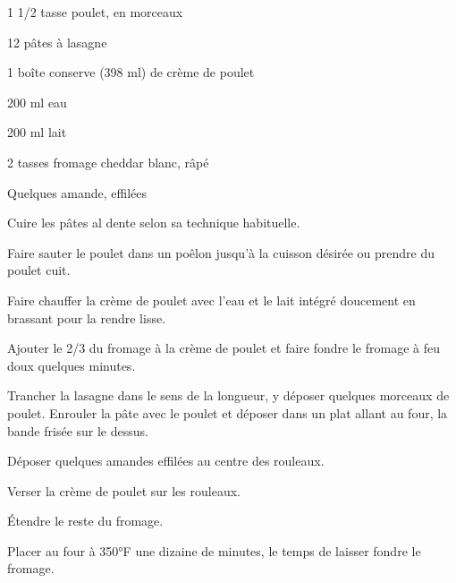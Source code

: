 


\totaltime{}


\begin{ingredients}
    \item 1 1/2 tasse poulet, en morceaux
    \item 12 pâtes à lasagne
    \item 1 boîte conserve (398 ml) de crème de poulet
    \item 200 ml eau
    \item 200 ml lait
    \item 2 tasses fromage cheddar blanc, râpé
    \item Quelques amande, effilées
\end{ingredients}

\begin{steps}
    \item Cuire les pâtes al dente selon sa technique habituelle.
    \item Faire sauter le poulet dans un poêlon jusqu'à la cuisson désirée ou prendre du poulet cuit.
    \item Faire chauffer la crème de poulet avec l'eau et le lait intégré doucement en brassant pour la rendre lisse.
    \item Ajouter le 2/3 du fromage à la crème de poulet et faire fondre le fromage à feu doux quelques minutes.
    \item Trancher la lasagne dans le sens de la longueur, y déposer quelques morceaux de poulet. Enrouler la pâte avec le poulet et déposer dans un plat allant au four, la bande frisée sur le dessus.
    \item Déposer quelques amandes effilées au centre des rouleaux.
    \item Verser la crème de poulet sur les rouleaux.
    \item Étendre le reste du fromage.
    \item Placer au four à 350°F une dizaine de minutes, le temps de laisser fondre le fromage.
\end{steps}
